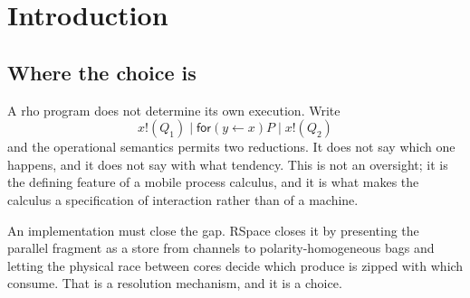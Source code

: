 \documentclass[11pt,a4paper]{article}
\theoremstyle{plain}
\theoremstyle{definition}
\theoremstyle{remark}
\begin{document}
\begin{abstract}
The dual-rail encoding also settles a question the previous version got wrong.
Under the payload encoding, a step that uses each bound name exactly once is
block-diagonal in the input basis, hence not a gate; that is a fact about the
encoding, and under dual rail every $2\times 2$ and the entangling
$4 \times 4$s are realised with no discard anywhere. Shor's algorithm is
rebuilt on that basis, with the whole term given, generated from the same gate
list the simulator runs.

Non-unitary clauses are contained rather than excluded: contractivity is a
judgement, the defect is dilated at the site, and the ancilla is neither traced
nor projected but written as a classical message which a retry loop may read
and the resource ledger charges. What was free post-selection becomes a bill of
$2^n$ firings.

We are explicit about what is not established: norm preservation is proved at a
configuration and conjectured for arbitrary concurrency; the staging condition
is a measured survey and not a theorem; the complexity containment is a
conjecture; and quantum alternation is known to be incompatible with the
standard fixed-point semantics for recursion, which our budget does not repair.
\end{abstract}

\tableofcontents

\section{Introduction}\label{sec:intro}

\subsection{Where the choice is}

A rho program does not determine its own execution. Write
\begin{equation}\label{eq:race}
  x!(Q_1) \mid \textsf{for}(y \leftarrow x)P \mid x!(Q_2)
\end{equation}
and the operational semantics permits two reductions. It does not say which one
happens, and it does not say with what tendency. This is not an oversight; it is
the defining feature of a mobile process calculus, and it is what makes the
calculus a specification of interaction rather than of a machine.

An implementation must close the gap. RSpace closes it by presenting the
parallel fragment as a store from channels to polarity-homogeneous bags and
letting the physical race between cores decide which produce is zipped with
which consume. That is a resolution mechanism, and it is a choice.
\end{document}
